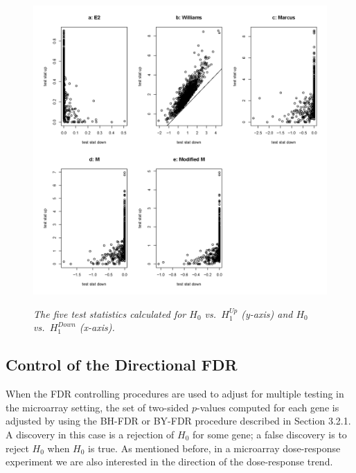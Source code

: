 \documentclass[10pt]{article}
\begin{document}
\begin{figure}[!h]
\centering
{\includegraphics[width=1\textwidth]{stat1a.png}}
\caption{\em{The five test statistics calculated for $H_0$ vs.\
$H_1^{Up}$ (y-axis) and $H_0$ vs.\ $H_1^{Down}$ (x-axis).}}
\label{stat1}
\end{figure}








\subsection{Control of the Directional FDR}
\label{sec: FDR}

When the FDR controlling procedures are used to adjust for multiple
testing in the microarray setting, the set of two-sided $p$-values
computed for each gene is adjusted by using the BH-FDR or BY-FDR
procedure described in Section 3.2.1. A discovery in this case is a
rejection of $H_0$ for some gene; a false discovery is to reject
$H_0$ when $H_0$ is true. As mentioned before, in a microarray
dose-response experiment we are also interested in the direction of
the dose-response trend.
\end{document}
